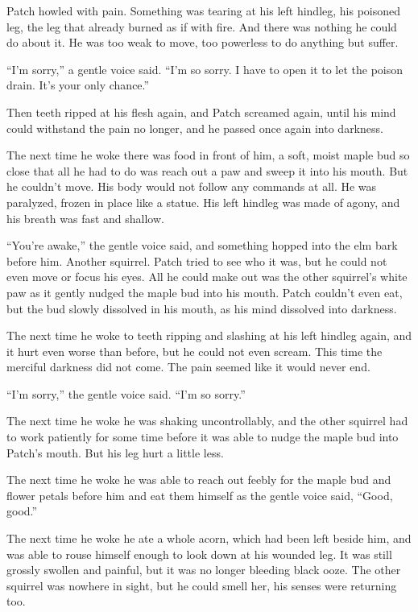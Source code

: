 \documentclass[ebook,oneside,openany,12pt]{memoir}
\begin{document}
Patch howled with pain. Something was tearing at his left hindleg, his
poisoned leg, the leg that already burned as if with fire. And there
was nothing he could do about it. He was too weak to move, too
powerless to do anything but suffer.

“I’m sorry,” a gentle voice said. “I’m so sorry. I have to open it to
let the poison drain. It’s your only chance.”

Then teeth ripped at his flesh again, and Patch screamed again, until
his mind could withstand the pain no longer, and he passed once again
into darkness.

The next time he woke there was food in front of him, a soft, moist
maple bud so close that all he had to do was reach out a paw and sweep
it into his mouth. But he couldn’t move. His body would not follow any
commands at all. He was paralyzed, frozen in place like a statue. His
left hindleg was made of agony, and his breath was fast and shallow.

“You’re awake,” the gentle voice said, and something hopped into the
elm bark before him. Another squirrel. Patch tried to see who it was,
but he could not even move or focus his eyes. All he could make out
was the other squirrel’s white paw as it gently nudged the maple bud
into his mouth. Patch couldn’t even eat, but the bud slowly dissolved
in his mouth, as his mind dissolved into darkness.

The next time he woke to teeth ripping and slashing at his left
hindleg again, and it hurt even worse than before, but he could not
even scream. This time the merciful darkness did not come. The pain
seemed like it would never end.

“I’m sorry,” the gentle voice said. “I’m so sorry.”

The next time he woke he was shaking uncontrollably, and the other
squirrel had to work patiently for some time before it was able to
nudge the maple bud into Patch’s mouth. But his leg hurt a little
less.

The next time he woke he was able to reach out feebly for the maple
bud and flower petals before him and eat them himself as the gentle
voice said, “Good, good.”

The next time he woke he ate a whole acorn, which had been left beside
him, and was able to rouse himself enough to look down at his wounded
leg. It was still grossly swollen and painful, but it was no longer
bleeding black ooze. The other squirrel was nowhere in sight, but he
could smell her, his senses were returning too.
\end{document}
